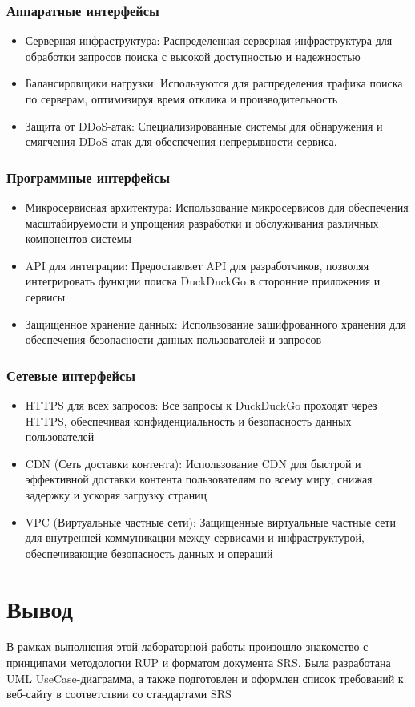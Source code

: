 \documentclass[12pt,a4paper]{article}
\begin{document}
\section{Аппаратные интерфейсы}
\begin{itemize}
    \item Серверная инфраструктура: Распределенная серверная инфраструктура для обработки запросов поиска с высокой доступностью и надежностью
    \item Балансировщики нагрузки: Используются для распределения трафика поиска по серверам, оптимизируя время отклика и производительность
    \item Защита от DDoS-атак: Специализированные системы для обнаружения и смягчения DDoS-атак для обеспечения непрерывности сервиса.    
\end{itemize}
\section{Программные интерфейсы}
\begin{itemize}
    \item Микросервисная архитектура: Использование микросервисов для обеспечения масштабируемости и упрощения разработки и обслуживания различных компонентов системы
    \item API для интеграции: Предоставляет API для разработчиков, позволяя интегрировать функции поиска DuckDuckGo в сторонние приложения и сервисы
    \item Защищенное хранение данных: Использование зашифрованного хранения для обеспечения безопасности данных пользователей и запросов
\end{itemize}
\section{Сетевые интерфейсы}
\begin{itemize}
    \item HTTPS для всех запросов: Все запросы к DuckDuckGo проходят через HTTPS, обеспечивая конфиденциальность и безопасность данных пользователей
    \item CDN (Сеть доставки контента): Использование CDN для быстрой и эффективной доставки контента пользователям по всему миру, снижая задержку и ускоряя загрузку страниц
    \item VPC (Виртуальные частные сети): Защищенные виртуальные частные сети для внутренней коммуникации между сервисами и инфраструктурой, обеспечивающие безопасность данных и операций
\end{itemize}
\part*{Вывод}
В рамках выполнения этой лабораторной работы произошло знакомство с принципами методологии RUP и форматом документа SRS. Была разработана UML UseCase-диаграмма, а также подготовлен и оформлен список требований к веб-сайту в соответствии со стандартами SRS
\end{document}
